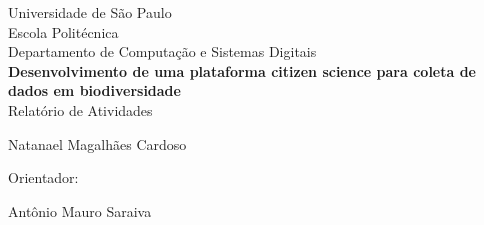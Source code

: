 \begin{titlepage}
  \begin{center}
    Universidade de São Paulo\\
    Escola Politécnica\\
    Departamento de Computação e Sistemas Digitais\\
    
    \vfill
    \large
    \textbf{Desenvolvimento de uma plataforma citizen science para coleta de dados em biodiversidade}\\
    \vspace{.6cm}
    Relatório de Atividades
    
    \vfill
    Natanael Magalhães Cardoso\\
    \begin{large} 
      Orientador:
    \end{large}Antônio Mauro Saraiva
    \vspace{2cm}
  \end{center}
\end{titlepage}